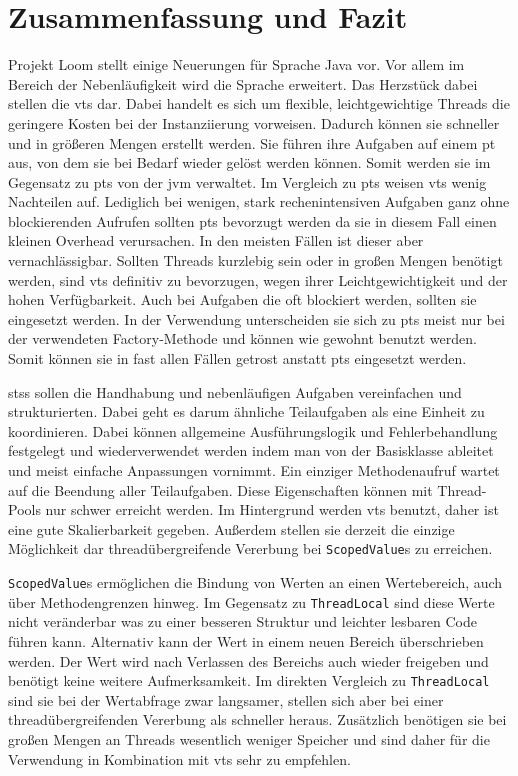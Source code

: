\chapter{Zusammenfassung und Fazit}
\label{cha:fazit}
    Projekt Loom stellt einige Neuerungen für Sprache Java vor. Vor allem im Bereich der Nebenläufigkeit wird die Sprache erweitert. Das Herzstück dabei stellen die \Glspl{vt} dar.
    Dabei handelt es sich um flexible, leichtgewichtige Threads die geringere Kosten bei der Instanziierung vorweisen. Dadurch können sie schneller und in größeren Mengen erstellt werden.
    Sie führen ihre Aufgaben auf einem \gls{pt} aus, von dem sie bei Bedarf wieder gelöst werden können. Somit werden sie im Gegensatz zu \Glspl{pt} von der \gls{jvm} verwaltet.
    Im Vergleich zu \Glspl{pt} weisen \Glspl{vt} wenig Nachteilen auf. Lediglich bei wenigen, stark rechenintensiven Aufgaben ganz ohne blockierenden Aufrufen sollten \Glspl{pt} bevorzugt werden da
    sie in diesem Fall einen kleinen Overhead verursachen. In den meisten Fällen ist dieser aber vernachlässigbar. Sollten Threads kurzlebig sein oder in großen Mengen benötigt werden, sind \Glspl{vt} definitiv
    zu bevorzugen, wegen ihrer Leichtgewichtigkeit und der hohen Verfügbarkeit. Auch bei Aufgaben die oft blockiert werden, sollten sie eingesetzt werden. In der Verwendung unterscheiden sie sich zu \Glspl{pt} 
    meist nur bei der verwendeten Factory-Methode und können wie gewohnt benutzt werden.
    Somit können sie in fast allen Fällen getrost anstatt \Glspl{pt} eingesetzt werden.

    \Glspl{sts} sollen die Handhabung und nebenläufigen Aufgaben vereinfachen und strukturierten. Dabei geht es darum ähnliche Teilaufgaben als eine Einheit zu koordinieren. Dabei können allgemeine
    Ausführungslogik und Fehlerbehandlung festgelegt und wiederverwendet werden indem man von der Basisklasse ableitet und meist einfache Anpassungen vornimmt. Ein einziger Methodenaufruf wartet auf
    die Beendung aller Teilaufgaben.
    Diese Eigenschaften können mit Thread-Pools nur
    schwer erreicht werden. Im Hintergrund werden \Glspl{vt} benutzt,
    daher ist eine gute Skalierbarkeit gegeben. Außerdem stellen sie derzeit die einzige Möglichkeit dar threadübergreifende Vererbung bei \texttt{ScopedValue}s zu erreichen.

    \texttt{ScopedValue}s ermöglichen die Bindung von Werten an einen Wertebereich, auch über Methodengrenzen hinweg. Im Gegensatz zu \texttt{ThreadLocal} sind diese Werte nicht veränderbar was zu einer 
    besseren Struktur und leichter lesbaren Code führen kann. Alternativ kann der Wert in einem neuen Bereich überschrieben werden. Der Wert wird nach Verlassen des Bereichs auch wieder freigeben und
    benötigt keine weitere Aufmerksamkeit. Im direkten Vergleich zu \texttt{ThreadLocal} sind sie bei der Wertabfrage zwar langsamer, stellen sich aber bei einer threadübergreifenden Vererbung als schneller heraus.
    Zusätzlich benötigen sie bei großen Mengen an Threads wesentlich weniger Speicher und sind daher für die Verwendung in Kombination mit \Glspl{vt} sehr zu empfehlen. 
